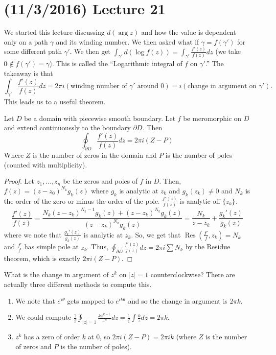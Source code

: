 \documentclass[11pt,leqno,oneside]{amsart}
\newcommand{\Res}{\operatorname{Res}}
\begin{document}
  \section{(11/3/2016) Lecture 21}
  We started this lecture discussing $d(\arg z)$ and how the value is
  dependent only on a path $\gamma$ and its winding number. We then
  asked what if $\gamma = f(\gamma')$ for some different path
  $\gamma' $. We then get $\int_{\gamma'} d(\log f(z)) =
  \int_{\gamma'} \frac{f'(z)}{f(z)}dz$ (we take $0 \not\in f(\gamma')
  = \gamma$). This is called the ``Logarithmic integral of $f$ on
  $\gamma'$.'' The takeaway is that \[
    \int_{\gamma'} \frac{f'(z)}{f(z)} dz = 2 \pi i (\text{winding
      number of }\gamma'\text{ around }0) = i(\text{change in argument
    on }\gamma').
  \]
  This leads us to a useful theorem.
  \begin{thm}
    Let $D$ be a domain with piecewise smooth boundary. Let $f$ be
    meromorphic on $D$ and extend continuoussly to the boundary
    $\partial D$. Then \[
      \oint_{\partial D} \frac{f'(z)}{f(z)} dz = 2\pi i (Z - P)
  \]
  Where $Z$ is the number of zeros in the domain and $P$ is the number
  of poles (counted with multiplicity). 
  \end{thm}
  \begin{proof}
    Let $z_1, \ldots, z_n$ be the zeros and poles of $f$ in $D$. Then,
    $f(z) = (z-z_0)^{N_k}g_k(z)$ where $g_k$ is analytic at $z_k$ and
    $g_k(z_k) \neq 0$ and $N_k$ is the order of the zero or minus the
    order of the pole. $\frac{f'(z)}{f(z)}$ is analytic off
    $\{z_k\}$. \[
      \frac{f'(z)}{f(z)} = \frac{N_k(z-z_k)^{N_k-1}g_k(z) +
        (z-z_k)^{N_k}g_k(z)}{(z-z_k)^{N_k}g_k(z)} = \frac{N_k}{z-z_k}
      + \frac{g_k'(z)}{g_k(z)}
    \]
    where we note that $\frac{g_k'(z)}{g_k(z)}$ is analytic at
    $z_k$. So, we get that $\Res(\frac{f'}{f},z_k) = N_k$ and
    $\frac{f'}{f}$ has simple pole at $z_k$. Thus, $\oint_{\partial D}
    \frac{f'(z)}{f(z)}dz = 2 \pi i \sum N_k$ by the Residue theorem,
    which is exactly $2 \pi i (Z-P)$. 
  \end{proof}
  \begin{example}
    What is the change in argument of $z^k$ on $|z|=1$
    counterclockwise? There are actually three different methods to
    compute this.
    \begin{enumerate}
    \item We note that $e^{i\theta}$ gets mapped to $e^{ik\theta}$ and
      so the change in argument is $2\pi k$.
    \item We could compute $\frac{1}{i} \oint_{|z|=1}
      \frac{kz^{k-1}}{z^k}dz = \frac{1}{i} \int \frac{k}{z}dz = 2\pi
      k$.
    \item $z^k$ has a zero of order $k$ at 0, so $2\pi i(Z-P) = 2\pi i
      k$ (where $Z$ is the number of zeros and $P$ is the number of
      poles). 
    \end{enumerate}
  \end{example}
\end{document}
